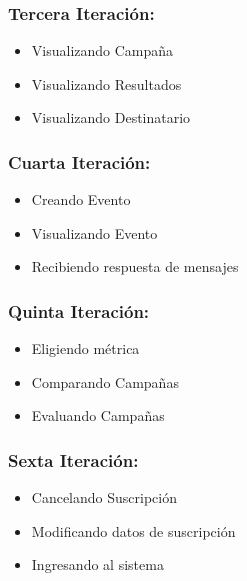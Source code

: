 \documentclass[a4paper, 11pt]{article}
\begin{document}
\subsubsection{Tercera Iteraci\'on:}
\begin{itemize}
\item Visualizando Campaña
\item Visualizando Resultados
\item Visualizando Destinatario
\end{itemize}


\subsubsection{Cuarta Iteraci\'on:}
\begin{itemize}
\item Creando Evento
\item Visualizando Evento
\item Recibiendo respuesta de mensajes
\end{itemize}


\subsubsection{Quinta Iteraci\'on:}
\begin{itemize}
\item Eligiendo métrica
\item Comparando Campañas
\item Evaluando Campañas
\end{itemize}


\subsubsection{Sexta Iteraci\'on:}
\begin{itemize}
\item Cancelando Suscripción
\item Modificando datos de suscripción
\item Ingresando al sistema
\end{itemize}
\end{document}
